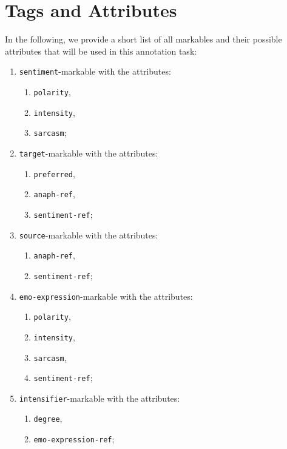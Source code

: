 \documentclass[11pt,a4paper]{article}
\theoremstyle{mytheoremstyle}
\begin{document}

\section{Tags and Attributes}\label{sec:markables}
In the following, we provide a short list of all markables and their
possible attributes that will be used in this annotation task:

\begin{multicols}{2}
  \begin{enumerate}
  \item \texttt{sentiment}-markable with the attributes:
    \begin{enumerate}
    \item \texttt{polarity},
    \item \texttt{intensity},
    \item \texttt{sarcasm};
    \end{enumerate}
  \item \texttt{target}-markable with the attributes:
    \begin{enumerate}
    \item \texttt{preferred},
    \item \texttt{anaph-ref},
    \item \texttt{sentiment-ref};
    \end{enumerate}
  \item \texttt{source}-markable with the attributes:
    \begin{enumerate}
    \item \texttt{anaph-ref},
    \item \texttt{sentiment-ref};
    \end{enumerate}
  \item \texttt{emo-expression}-markable with the attributes:
    \begin{enumerate}
    \item \texttt{polarity},
    \item \texttt{intensity},
    \item \texttt{sarcasm},
    \item \texttt{sentiment-ref};
    \end{enumerate}
  \item \texttt{intensifier}-markable with the attributes:
    \begin{enumerate}
    \item \texttt{degree},
    \item \texttt{emo-expression-ref};

\end{enumerate}
\end{enumerate}
\end{multicols}
\end{document}
